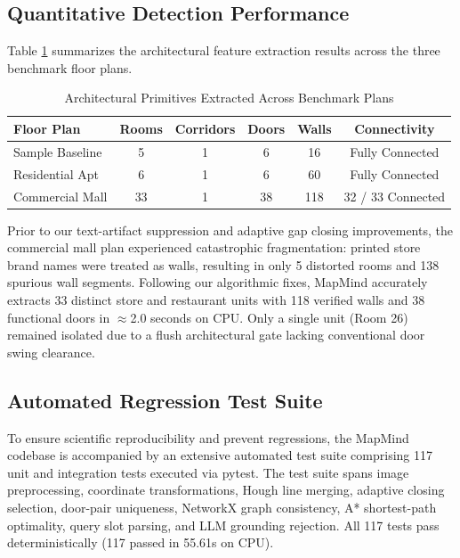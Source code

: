 \documentclass[conference]{IEEEtran}
\begin{document}
\subsection{Quantitative Detection Performance}
Table \ref{tab:results} summarizes the architectural feature extraction results across the three benchmark floor plans.

\begin{table}[htbp]
\caption{Architectural Primitives Extracted Across Benchmark Plans}
\begin{center}
\begin{tabular}{lccccc}
\toprule
\textbf{Floor Plan} & \textbf{Rooms} & \textbf{Corridors} & \textbf{Doors} & \textbf{Walls} & \textbf{Connectivity} \\
\midrule
Sample Baseline     & 5  & 1 & 6  & 16  & Fully Connected \\
Residential Apt     & 6  & 1 & 6  & 60  & Fully Connected \\
Commercial Mall     & 33 & 1 & 38 & 118 & 32 / 33 Connected \\
\bottomrule
\end{tabular}
\label{tab:results}
\end{center}
\end{table}

Prior to our text-artifact suppression and adaptive gap closing improvements, the commercial mall plan experienced catastrophic fragmentation: printed store brand names were treated as walls, resulting in only 5 distorted rooms and 138 spurious wall segments. Following our algorithmic fixes, MapMind accurately extracts 33 distinct store and restaurant units with 118 verified walls and 38 functional doors in $\approx$2.0 seconds on CPU. Only a single unit (Room 26) remained isolated due to a flush architectural gate lacking conventional door swing clearance.

\subsection{Automated Regression Test Suite}
To ensure scientific reproducibility and prevent regressions, the MapMind codebase is accompanied by an extensive automated test suite comprising 117 unit and integration tests executed via pytest. The test suite spans image preprocessing, coordinate transformations, Hough line merging, adaptive closing selection, door-pair uniqueness, NetworkX graph consistency, A* shortest-path optimality, query slot parsing, and LLM grounding rejection. All 117 tests pass deterministically (117 passed in 55.61s on CPU).
\end{document}
